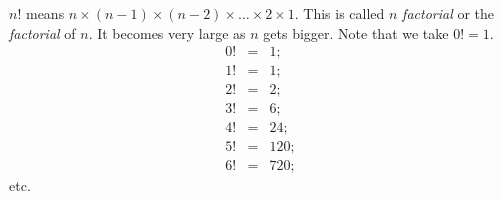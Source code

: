 $n!$ means $n\times (n-1)\times (n-2)\times \dots \times 2 \times 1$. 
  This is called $n$ \emph{factorial} or the \emph{factorial} of $n$. 
  It becomes very large as $n$ gets bigger.
  Note that we take $0!=1$.
  \begin{eqnarray*}
  0! & = & 1;\\
  1! & = & 1;\\
  2! & = & 2;\\
  3! & = & 6;\\
  4! & = & 24;\\
  5! & = & 120;\\
  6! & = & 720;
  \end{eqnarray*}
etc.